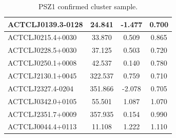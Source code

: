 \documentclass[11pt,a4paper,twoside,graphicx,color]{article}
\begin{document}
\begin{table}
\begin{tabular}{|l  || c | c | c | }
  ACTCLJ0139.3-0128 &  24.841 &  -1.477 &   0.700 \\ \hline
  ACTCLJ0215.4+0030 &  33.870 &   0.509 &   0.865 \\ \hline
  ACTCLJ0228.5+0030 &  37.125 &   0.503 &   0.720 \\ \hline
  ACTCLJ0250.1+0008 &  42.537 &   0.140 &   0.780 \\ \hline
  ACTCLJ2130.1+0045 & 322.537 &   0.759 &   0.710 \\ \hline
  ACTCLJ2327.4-0204 & 351.866 &  -2.078 &   0.705 \\ \hline
  ACTCLJ0342.0+0105 &  55.501 &   1.087 &   1.070 \\ \hline
  ACTCLJ2351.7+0009 & 357.935 &   0.154 &   0.990 \\ \hline
  ACTCLJ0044.4+0113 &  11.108 &   1.222 &   1.110 \\ \hline
\end{tabular}
\label{tab:ACT_sample}
 \caption{PSZ1 confirmed cluster sample.}
\end{table}
\end{document}
